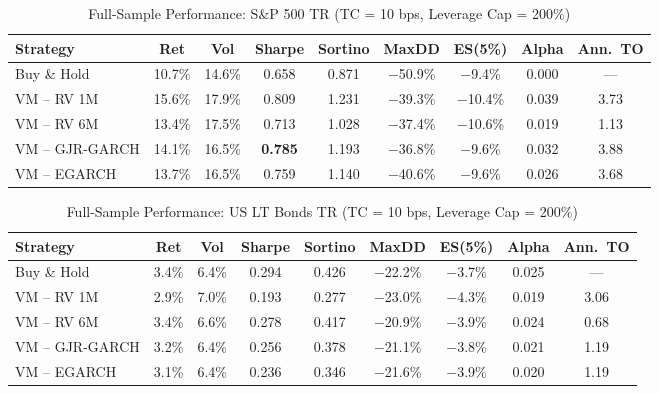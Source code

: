\documentclass[12pt, a4paper]{article}
\begin{document}
\begin{table}[H]
  \centering
  \caption{Full-Sample Performance: S\&P 500 TR (TC = 10 bps, Leverage Cap = 200\%)}
  \label{tab:perf_spxt}
  \footnotesize
  \begin{tabular}{lcccccccc}
    \toprule
    \textbf{Strategy} & \textbf{Ret} & \textbf{Vol} & \textbf{Sharpe}
                      & \textbf{Sortino} & \textbf{MaxDD} & \textbf{ES(5\%)}
                      & \textbf{Alpha} & \textbf{Ann.~TO} \\
    \midrule
    Buy \& Hold      & 10.7\% & 14.6\% & 0.658          & 0.871  & $-$50.9\% & $-$9.4\%  & 0.000 & --- \\
    VM -- RV 1M      & 15.6\% & 17.9\% & 0.809          & 1.231  & $-$39.3\% & $-$10.4\% & 0.039 & 3.73 \\
    VM -- RV 6M      & 13.4\% & 17.5\% & 0.713          & 1.028  & $-$37.4\% & $-$10.6\% & 0.019 & 1.13 \\
    VM -- GJR-GARCH  & 14.1\% & 16.5\% & \textbf{0.785} & 1.193  & $-$36.8\% & $-$9.6\%  & 0.032 & 3.88 \\
    VM -- EGARCH     & 13.7\% & 16.5\% & 0.759          & 1.140  & $-$40.6\% & $-$9.6\%  & 0.026 & 3.68 \\
    \bottomrule
  \end{tabular}
\end{table}

\begin{table}[H]
  \centering
  \caption{Full-Sample Performance: US LT Bonds TR (TC = 10 bps, Leverage Cap = 200\%)}
  \label{tab:perf_bonds}
  \footnotesize
  \begin{tabular}{lcccccccc}
    \toprule
    \textbf{Strategy} & \textbf{Ret} & \textbf{Vol} & \textbf{Sharpe}
                      & \textbf{Sortino} & \textbf{MaxDD} & \textbf{ES(5\%)}
                      & \textbf{Alpha} & \textbf{Ann.~TO} \\
    \midrule
    Buy \& Hold      & 3.4\% & 6.4\% & 0.294          & 0.426 & $-$22.2\% & $-$3.7\% & 0.025 & --- \\
    VM -- RV 1M      & 2.9\% & 7.0\% & 0.193          & 0.277 & $-$23.0\% & $-$4.3\% & 0.019 & 3.06 \\
    VM -- RV 6M      & 3.4\% & 6.6\% & 0.278          & 0.417 & $-$20.9\% & $-$3.9\% & 0.024 & 0.68 \\
    VM -- GJR-GARCH  & 3.2\% & 6.4\% & 0.256          & 0.378 & $-$21.1\% & $-$3.8\% & 0.021 & 1.19 \\
    VM -- EGARCH     & 3.1\% & 6.4\% & 0.236          & 0.346 & $-$21.6\% & $-$3.9\% & 0.020 & 1.19 \\
    \bottomrule
  \end{tabular}
\end{table}
\end{document}
